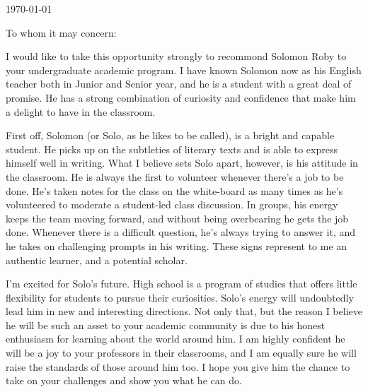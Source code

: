 \documentclass[11pt, letterpaper]{letter} %
\begin{document}

\begin{letter}{
	\today\\	
}


\opening{To whom it may concern:}

I would like to take this opportunity strongly to recommond Solomon Roby to your undergraduate academic program. I have known Solomon now as his English teacher both in Junior and Senior year, and he is a student with a great deal of promise. He has a strong combination of curiosity and confidence that make him a delight to have in the classroom.

First off, Solomon (or Solo, as he likes to be called), is a bright and capable student. He picks up on the subtleties of literary texts and is able to express himself well in writing. What I believe sets Solo apart, however, is his attitude in the classroom. He is always the first to volunteer whenever there's a job to be done. He's taken notes for the class on the white-board as many times as he's volunteered to moderate a student-led class discussion. In groups, his energy keeps the team moving forward, and without being overbearing he gets the job done. Whenever there is a difficult question, he's always trying to answer it, and he takes on challenging prompts in his writing. These signs represent to me an authentic learner, and a potential scholar.

I'm excited for Solo's future. High school is a program of studies that offers little flexibility for students to pursue their curiosities. Solo's energy will undoubtedly lead him in new and interesting directions. Not only that, but the reason I believe he will be such an asset to your academic community is due to his honest enthusiasm for learning about the world around him. I am highly confident he will be a joy to your professors in their classrooms, and I am equally sure he will raise the standards of those around him too. I hope you give him the chance to take on your challenges and show you what he can do.


\end{letter}
\end{document}
